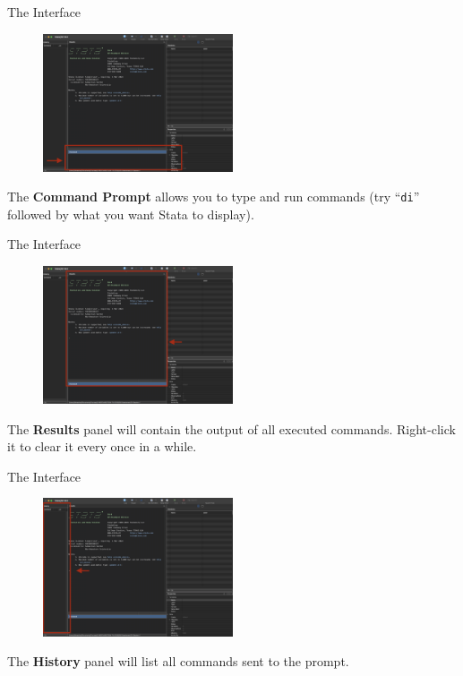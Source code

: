 \documentclass[11pt,notes=hide,aspectratio=169,mathserif]{beamer}
\begin{document}
\begin{frame}{The Interface}
    \begin{figure}
        \centering
        \includegraphics[width=0.5\textwidth]{inputs/ta1_result_window2.png}
    \end{figure}
   The \textbf{Command Prompt} allows you to type and run commands (try ``\texttt{di}'' followed by what you want Stata to display).
\end{frame}

\begin{frame}{The Interface}
    \begin{figure}
        \centering
        \includegraphics[width=0.5\textwidth]{inputs/ta1_result_window3.png}
    \end{figure}
    The \textbf{Results} panel will contain the output of all executed commands. 
    Right-click it to clear it every once in a while. 
\end{frame}

\begin{frame}{The Interface}
    \begin{figure}
        \centering
        \includegraphics[width=0.5\textwidth]{inputs/ta1_result_window4.png}
    \end{figure}
    The \textbf{History} panel will list all commands sent to the prompt. 
\end{frame}
\end{document}
